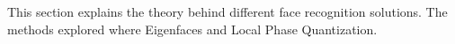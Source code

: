 This section explains the theory behind different face recognition solutions. The methods explored where Eigenfaces and Local Phase Quantization.
